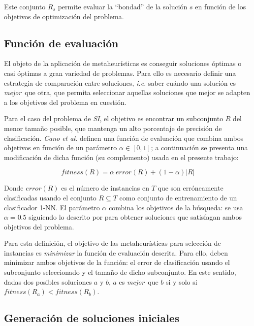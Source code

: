 Este conjunto $R_s$ permite evaluar la ``bondad'' de la solución $s$ en función de los objetivos de optimización del problema.

\subsection{Función de evaluación}

El objeto de la aplicación de metaheurísticas es conseguir soluciones óptimas o casi óptimas a gran variedad de problemas. Para ello es necesario definir una estrategia de comparación entre soluciones, \emph{i.e.} saber cuándo una solución es \guillemotleft\emph{mejor}\guillemotright\ que otra, que permita seleccionar aquellas soluciones que mejor se adapten a los objetivos del problema en cuestión.

Para el caso del problema de \emph{SI}, el objetivo es encontrar un subconjunto $R$ del menor tamaño posible, que mantenga un alto porcentaje de precisión de clasificación. \emph{Cano et al.} \cite{cano2003using} definen una función de evaluación que combina ambos objetivos en función de un parámetro $\alpha \in [0,1]$; a continuación se presenta una modificación de dicha función (su complemento) usada en el presente trabajo:

\begin{equation}
\mathit{fitness}(R) = \alpha\ \mathit{error}(R) + (1 - \alpha) \vert R \vert
\end{equation}

Donde $\mathit{error}(R)$ es el número de instancias en $T$ que son erróneamente clasificadas usando el conjunto $R \subseteq T$ como conjunto de entrenamiento de un clasificador 1-NN. El parámetro $\alpha$ combina los objetivos de la búsqueda: se usa $\alpha = 0.5$ siguiendo lo descrito por \cite{cano2003using} para obtener soluciones que satisfagan ambos objetivos del problema.

Para esta definición, el objetivo de las metaheurísticas para selección de instancias es \emph{minimizar} la función de evaluación descrita. Para ello, deben minimizar ambos objetivos de la función: el error de clasificación usando el subconjunto seleccionado y el tamaño de dicho subconjunto. En este sentido, dadas dos posibles soluciones $a$ y $b$, $a$ es \guillemotleft\emph{mejor}\guillemotright\ que $b$ si y solo si $\mathit{fitness}(R_a) < \mathit{fitness}(R_b)$.

\subsection{Generación de soluciones iniciales}
\label{generacion-sol-inic}

